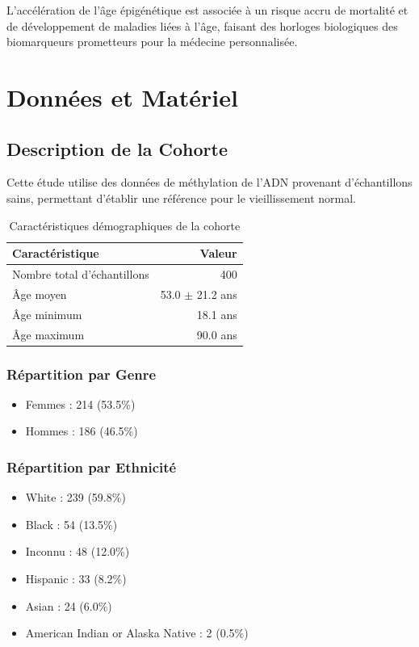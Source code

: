 \documentclass[11pt,a4paper]{article}
\begin{document}
L'accélération de l'âge épigénétique est associée à un risque accru de mortalité et de 
développement de maladies liées à l'âge, faisant des horloges biologiques des biomarqueurs 
prometteurs pour la médecine personnalisée.

\section{Données et Matériel}

\subsection{Description de la Cohorte}

Cette étude utilise des données de méthylation de l'ADN provenant d'échantillons sains, 
permettant d'établir une référence pour le vieillissement normal.

\begin{table}[htbp]
\centering
\begin{tabular}{lr}
\hline
\textbf{Caractéristique} & \textbf{Valeur} \\
\hline
Nombre total d'échantillons & 400 \\
Âge moyen & 53.0 $\pm$ 21.2 ans \\
Âge minimum & 18.1 ans \\
Âge maximum & 90.0 ans \\
\hline
\end{tabular}
\caption{Caractéristiques démographiques de la cohorte}
\label{tab:demographics}
\end{table}

\subsubsection{Répartition par Genre}

\begin{itemize}
    \item Femmes : 214 (53.5\%)
    \item Hommes : 186 (46.5\%)
\end{itemize}

\subsubsection{Répartition par Ethnicité}
\begin{itemize}
    \item White : 239 (59.8\%)
    \item Black : 54 (13.5\%)
    \item Inconnu : 48 (12.0\%)
    \item Hispanic : 33 (8.2\%)
    \item Asian : 24 (6.0\%)
    \item American Indian or Alaska Native : 2 (0.5\%)
\end{itemize}
\end{document}
